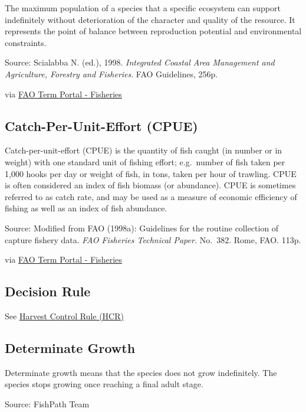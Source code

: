 \documentclass[
  11pt,
]{book}
\begin{document}
The maximum population of a species that a specific ecosystem can support indefinitely without deterioration of the character and quality of the resource. It represents the point of balance between reproduction potential and environmental constraints.

Source: Scialabba N. (ed.), 1998. \emph{Integrated Coastal Area Management and Agriculture, Forestry and Fisheries}. FAO Guidelines, 256p.

via \href{http://www.fao.org/fishery/glossary/en}{FAO Term Portal - Fisheries}

\hypertarget{catch-per-unit-effort-cpue}{%
\subsection{Catch-Per-Unit-Effort (CPUE)}\label{catch-per-unit-effort-cpue}}

Catch-per-unit-effort (CPUE) is the quantity of fish caught (in number or in weight) with one standard unit of fishing effort; e.g.~number of fish taken per 1,000 hooks per day or weight of fish, in tons, taken per hour of trawling. CPUE is often considered an index of fish biomass (or abundance). CPUE is sometimes referred to as catch rate, and may be used as a measure of economic efficiency of fishing as well as an index of fish abundance.

Source: Modified from FAO (1998a): Guidelines for the routine collection of capture fishery data. \emph{FAO Fisheries Technical Paper.} No.~382. Rome, FAO. 113p.

via \href{http://www.fao.org/fishery/glossary/en}{FAO Term Portal - Fisheries}

\hypertarget{decision-rule}{%
\subsection{Decision Rule}\label{decision-rule}}

See \protect\hyperlink{harvest-control-rule-hcr}{Harvest Control Rule (HCR)}

\hypertarget{determinate-growth}{%
\subsection{Determinate Growth}\label{determinate-growth}}

Determinate growth means that the species does not grow indefinitely. The species stops growing once reaching a final adult stage.

Source: FishPath Team
\end{document}
